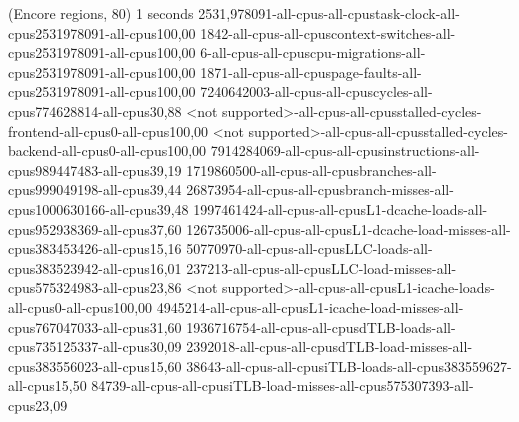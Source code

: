 (Encore regions, 80)
1 seconds
2531,978091-all-cpus-all-cpustask-clock-all-cpus2531978091-all-cpus100,00
1842-all-cpus-all-cpuscontext-switches-all-cpus2531978091-all-cpus100,00
6-all-cpus-all-cpuscpu-migrations-all-cpus2531978091-all-cpus100,00
1871-all-cpus-all-cpuspage-faults-all-cpus2531978091-all-cpus100,00
7240642003-all-cpus-all-cpuscycles-all-cpus774628814-all-cpus30,88
<not supported>-all-cpus-all-cpusstalled-cycles-frontend-all-cpus0-all-cpus100,00
<not supported>-all-cpus-all-cpusstalled-cycles-backend-all-cpus0-all-cpus100,00
7914284069-all-cpus-all-cpusinstructions-all-cpus989447483-all-cpus39,19
1719860500-all-cpus-all-cpusbranches-all-cpus999049198-all-cpus39,44
26873954-all-cpus-all-cpusbranch-misses-all-cpus1000630166-all-cpus39,48
1997461424-all-cpus-all-cpusL1-dcache-loads-all-cpus952938369-all-cpus37,60
126735006-all-cpus-all-cpusL1-dcache-load-misses-all-cpus383453426-all-cpus15,16
50770970-all-cpus-all-cpusLLC-loads-all-cpus383523942-all-cpus16,01
237213-all-cpus-all-cpusLLC-load-misses-all-cpus575324983-all-cpus23,86
<not supported>-all-cpus-all-cpusL1-icache-loads-all-cpus0-all-cpus100,00
4945214-all-cpus-all-cpusL1-icache-load-misses-all-cpus767047033-all-cpus31,60
1936716754-all-cpus-all-cpusdTLB-loads-all-cpus735125337-all-cpus30,09
2392018-all-cpus-all-cpusdTLB-load-misses-all-cpus383556023-all-cpus15,60
38643-all-cpus-all-cpusiTLB-loads-all-cpus383559627-all-cpus15,50
84739-all-cpus-all-cpusiTLB-load-misses-all-cpus575307393-all-cpus23,09
